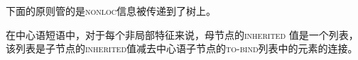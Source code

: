 下面的原则管的是\textsc{nonloc}信息被传递到了树上。

\begin{samepage}
\begin{principle-break}[非局部特征原则]
\label{Prinzip-der-Nichtlokalen-Merkmale}
在中心语短语中，对于每个非局部特征来说，母节点的\textsc{inherited} 值是一个列表，该列表是子节点的\textsc{inherited}值减去中心语子节点的\textsc{to-bind}列表中的元素的连接。
\end{principle-break}
\end{samepage}


